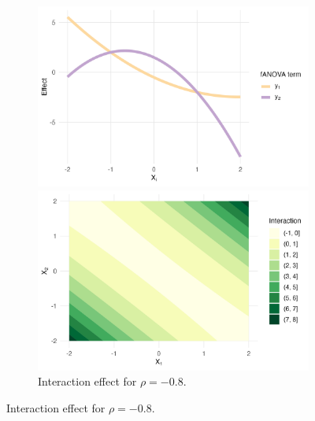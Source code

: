 \begin{figure}[htpb]
    \centering
    \begin{subfigure}[t]{\textwidth}
        \centering
        \begin{minipage}[t]{0.49\textwidth}
            \includegraphics[width=\textwidth]{images/experiment_section/full_a1m20_a2m20_a11p10_a22m10_a12p10_rhom08_main.png}
            \caption{Main effect for $\rho = -0.8$.}
        \end{minipage}%
        \hfill
        \begin{minipage}[t]{0.49\textwidth}
            \includegraphics[width=\textwidth]{images/experiment_section/full_a1m20_a2m20_a11p10_a22m10_a12p10_rhom08_interaction.png}
            \caption{Interaction effect for $\rho = -0.8$.}
        \end{minipage}
    \end{subfigure}


\end{figure}
